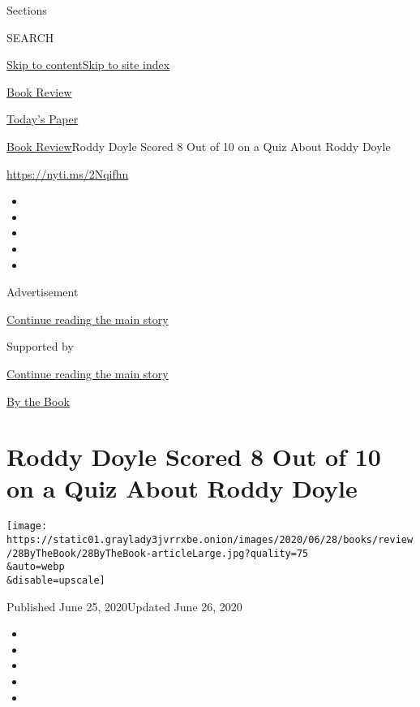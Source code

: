 Sections

SEARCH

\protect\hyperlink{site-content}{Skip to
content}\protect\hyperlink{site-index}{Skip to site index}

\href{https://www.nytimes3xbfgragh.onion/section/books/review}{Book
Review}

\href{https://myaccount.nytimes3xbfgragh.onion/auth/login?response_type=cookie\&client_id=vi}{}

\href{https://www.nytimes3xbfgragh.onion/section/todayspaper}{Today's
Paper}

\href{/section/books/review}{Book Review}\textbar{}Roddy Doyle Scored 8
Out of 10 on a Quiz About Roddy Doyle

\url{https://nyti.ms/2Nqifhn}

\begin{itemize}
\item
\item
\item
\item
\item
\end{itemize}

Advertisement

\protect\hyperlink{after-top}{Continue reading the main story}

Supported by

\protect\hyperlink{after-sponsor}{Continue reading the main story}

\href{/column/by-the-book}{By the Book}

\hypertarget{roddy-doyle-scored-8-out-of-10-on-a-quiz-about-roddy-doyle}{%
\section{Roddy Doyle Scored 8 Out of 10 on a Quiz About Roddy
Doyle}\label{roddy-doyle-scored-8-out-of-10-on-a-quiz-about-roddy-doyle}}

\texttt{[image: https://static01.graylady3jvrrxbe.onion/images/2020/06/28/books/review/28ByTheBook/28ByTheBook-articleLarge.jpg?quality=75\\\&auto=webp\\\&disable=upscale]}

Published June 25, 2020Updated June 26, 2020

\begin{itemize}
\item
\item
\item
\item
\item
\end{itemize}

